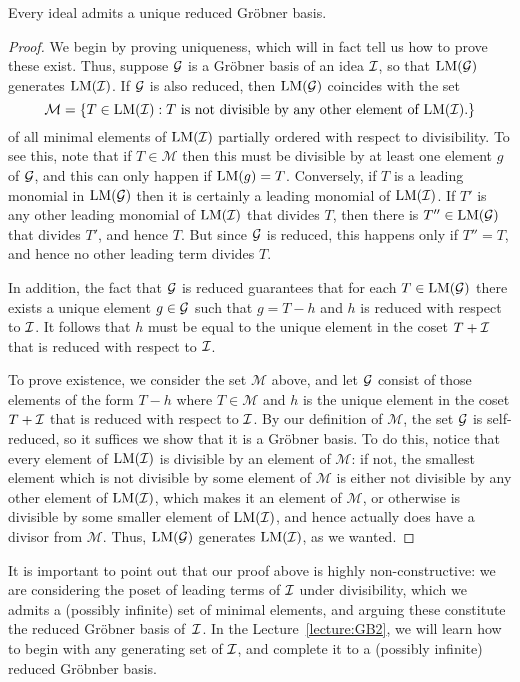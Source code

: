 \begin{theorem}
Every ideal admits a unique reduced Gr\"obner basis.
\end{theorem}

\begin{proof}
We begin by proving uniqueness, which will in fact tell us
how to prove these exist. Thus, suppose $\mathcal G$ is a 
Gr\"obner basis of an idea $\mathcal{I}$, so that
$\operatorname{LM}(\mathcal G)$ generates $\operatorname{LM}(\mathcal{I})$. If $\mathcal G$ is
also reduced, then $\operatorname{LM}(\mathcal G)$ coincides with the set
\[ 
 \mathcal M = \{ T\in \operatorname{LM}(\mathcal{I}) : \text{$T$ is not divisible by any
 other element of  $\operatorname{LM}(\mathcal{I})$}.
 	\}
	\]
of all minimal elements of $\operatorname{LM}(\mathcal{I})$ partially ordered
with respect to divisibility. To see this, note that if
$T\in \mathcal M$ then this must be divisible by at least
one element $g$ of $\mathcal G$, and this can only happen 
if $\operatorname{LM}(g) = T$. Conversely, if $T$ is a leading monomial
in $\operatorname{LM}(\mathcal G)$ then it is certainly a leading monomial
of $\operatorname{LM}(\mathcal{I})$. If $T'$ is any other
leading monomial of $\operatorname{LM}(\mathcal{I})$ that divides $T$, then there is
$T''\in \operatorname{LM}(\mathcal G)$ that divides $T'$, and hence $T$. But
since $\mathcal G$ is reduced, this happens only if $T''=T$, and
hence no other leading term divides $T$.

In addition, the fact that $\mathcal G$ is reduced guarantees
that for each $T\in\operatorname{LM}(\mathcal G)$ there exists a unique element
$g\in\mathcal G$ such that $g= T-h$ and $h$ is reduced with
respect to $\mathcal{I}$. It follows that $h$ must be equal to the
unique element in the coset $T+\mathcal{I}$ that is reduced
with respect to $\mathcal{I}$.

To prove existence, we consider the set $\mathcal{M}$ above,
and let $\mathcal G$ consist of those elements of the form $T-h$
where $T\in \mathcal{M}$ and $h$ is the unique element in
the coset $T+\mathcal{I}$ that is reduced with respect to $\mathcal{I}$. 
By our definition of $\mathcal M$, the set $\mathcal G$ is self-reduced, 
so it suffices we show that it is a Gr\"obner basis. 
To do this, notice that every element of $\operatorname{LM}(\mathcal{I})$
is divisible by an element of $\mathcal M$: if not,
the smallest element which is not divisible by some
element of $\mathcal M$ is either not divisible by
any other element of $\operatorname{LM}(\mathcal{I})$, which makes it an element
of $\mathcal M$, or otherwise is divisible by some
smaller element of $\operatorname{LM}(\mathcal{I})$, and hence actually
does have a divisor from $\mathcal M$. Thus,
$\operatorname{LM}(\mathcal G)$ generates $\operatorname{LM}(\mathcal{I})$, as we wanted.
\end{proof}

It is important to point out that our proof above is highly
non-constructive: we are considering the poset of
leading terms of $\mathcal{I}$ under divisibility, 
which we admits a (possibly infinite) set of 
minimal elements, and arguing these constitute the
reduced Gr\"obner basis of~$\mathcal{I}$. In the Lecture~\ref{lecture:GB2}, we will learn how to begin with any generating
set of $\mathcal{I}$, and complete it to a (possibly infinite)
reduced Gr\"obnber basis.
 
